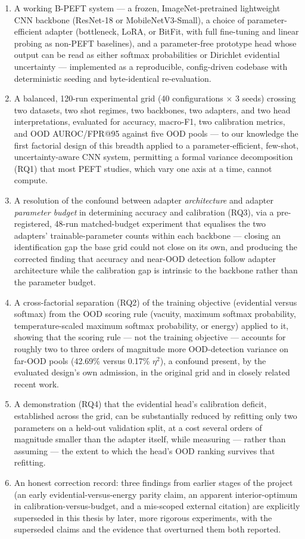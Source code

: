\documentclass{iutbscthesis}
\begin{document}
\begin{enumerate}
    \item A working B-PEFT system — a frozen, ImageNet-pretrained lightweight CNN backbone (ResNet-18 or MobileNetV3-Small), a choice of parameter-efficient adapter (bottleneck, LoRA, or BitFit, with full fine-tuning and linear probing as non-PEFT baselines), and a parameter-free prototype head whose output can be read as either softmax probabilities or Dirichlet evidential uncertainty — implemented as a reproducible, config-driven codebase with deterministic seeding and byte-identical re-evaluation.
    \item A balanced, 120-run experimental grid (40 configurations $\times$ 3 seeds) crossing two datasets, two shot regimes, two backbones, two adapters, and two head interpretations, evaluated for accuracy, macro-F1, two calibration metrics, and OOD AUROC/FPR@95 against five OOD pools — to our knowledge the first factorial design of this breadth applied to a parameter-efficient, few-shot, uncertainty-aware CNN system, permitting a formal variance decomposition (RQ1) that most PEFT studies, which vary one axis at a time, cannot compute.
    \item A resolution of the confound between adapter \emph{architecture} and adapter \emph{parameter budget} in determining accuracy and calibration (RQ3), via a pre-registered, 48-run matched-budget experiment that equalises the two adapters' trainable-parameter counts within each backbone — closing an identification gap the base grid could not close on its own, and producing the corrected finding that accuracy and near-OOD detection follow adapter architecture while the calibration gap is intrinsic to the backbone rather than the parameter budget.
    \item A cross-factorial separation (RQ2) of the training objective (evidential versus softmax) from the OOD scoring rule (vacuity, maximum softmax probability, temperature-scaled maximum softmax probability, or energy) applied to it, showing that the scoring rule — not the training objective — accounts for roughly two to three orders of magnitude more OOD-detection variance on far-OOD pools (42.69\% versus 0.17\% $\eta^2$), a confound present, by the evaluated design's own admission, in the original grid and in closely related recent work.
    \item A demonstration (RQ4) that the evidential head's calibration deficit, established across the grid, can be substantially reduced by refitting only two parameters on a held-out validation split, at a cost several orders of magnitude smaller than the adapter itself, while measuring — rather than assuming — the extent to which the head's OOD ranking survives that refitting.
    \item An honest correction record: three findings from earlier stages of the project (an early evidential-versus-energy parity claim, an apparent interior-optimum in calibration-versus-budget, and a mis-scoped external citation) are explicitly superseded in this thesis by later, more rigorous experiments, with the superseded claims and the evidence that overturned them both reported.
\end{enumerate}
\end{document}
